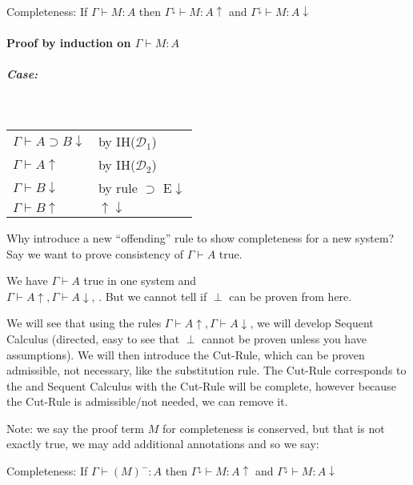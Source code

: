 \documentclass[12 pt]{article}
\begin{document}
	Completeness: If $\Gamma \vdash M : A$ then
$\Gamma^{\downarrow} \vdash M : A \uparrow$ and
$\Gamma^{\downarrow} \vdash M : A \downarrow$

	\paragraph{Proof by induction on $\Gamma \vdash M : A$}
	\subparagraph{Case:} \DP
	\\
	\begin{tabular}{l l}
		$\Gamma \vdash A \supset B \downarrow$ & by IH($\mathcal{D}_1$)
		\\ $\Gamma \vdash A \uparrow$ & by IH($\mathcal{D}_2$)
		\\ $\Gamma \vdash B \downarrow$ & by rule $\supset$ E$\downarrow$
		\\ $\Gamma \vdash B \uparrow$ & $\uparrow \downarrow$
	\end{tabular}

	Why introduce a new ``offending'' rule to show completeness
	for a new system? Say we want to prove consistency of $\Gamma
\vdash A$ true.

	We have $\Gamma \vdash A$ true in one system and
	\\ $\Gamma \vdash A \uparrow, \Gamma \vdash A \downarrow$,
	\DP. But we cannot tell if $\perp$ can be proven
	from here.

	We will see that using the rules $\Gamma \vdash A \uparrow,
\Gamma \vdash A \downarrow$, we will develop Sequent Calculus
	(directed, easy to see that $\perp$ cannot be proven unless
	you have assumptions). We will then introduce the Cut-Rule,
	which can be proven admissible, not necessary, like the
	substitution rule. The Cut-Rule corresponds to the \DP and Sequent Calculus with the Cut-Rule will
	be complete, however because the Cut-Rule is admissible/not
	needed, we can remove it.

	Note: we say the proof term $M$ for completeness is conserved,
	but that is not exactly true, we may add additional
	annotations and so we say:

	Completeness: If $\Gamma \vdash (M)^{-} : A$ then
$\Gamma^{\downarrow} \vdash M : A \uparrow$ and
$\Gamma^{\downarrow} \vdash M : A \downarrow$
\end{document}
